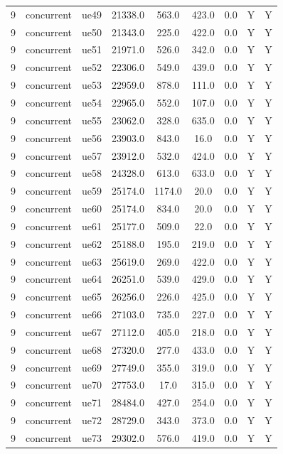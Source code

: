 \begin{table}[ht]
\begin{tabular}{|c|c|c|c|c|c|c|c|c|}
9 & concurrent & ue49 & 21338.0 & 563.0 & 423.0 & 0.0 & Y & Y \\
9 & concurrent & ue50 & 21343.0 & 225.0 & 422.0 & 0.0 & Y & Y \\
9 & concurrent & ue51 & 21971.0 & 526.0 & 342.0 & 0.0 & Y & Y \\
9 & concurrent & ue52 & 22306.0 & 549.0 & 439.0 & 0.0 & Y & Y \\
9 & concurrent & ue53 & 22959.0 & 878.0 & 111.0 & 0.0 & Y & Y \\
9 & concurrent & ue54 & 22965.0 & 552.0 & 107.0 & 0.0 & Y & Y \\
9 & concurrent & ue55 & 23062.0 & 328.0 & 635.0 & 0.0 & Y & Y \\
9 & concurrent & ue56 & 23903.0 & 843.0 & 16.0 & 0.0 & Y & Y \\
9 & concurrent & ue57 & 23912.0 & 532.0 & 424.0 & 0.0 & Y & Y \\
9 & concurrent & ue58 & 24328.0 & 613.0 & 633.0 & 0.0 & Y & Y \\
9 & concurrent & ue59 & 25174.0 & 1174.0 & 20.0 & 0.0 & Y & Y \\
9 & concurrent & ue60 & 25174.0 & 834.0 & 20.0 & 0.0 & Y & Y \\
9 & concurrent & ue61 & 25177.0 & 509.0 & 22.0 & 0.0 & Y & Y \\
9 & concurrent & ue62 & 25188.0 & 195.0 & 219.0 & 0.0 & Y & Y \\
9 & concurrent & ue63 & 25619.0 & 269.0 & 422.0 & 0.0 & Y & Y \\
9 & concurrent & ue64 & 26251.0 & 539.0 & 429.0 & 0.0 & Y & Y \\
9 & concurrent & ue65 & 26256.0 & 226.0 & 425.0 & 0.0 & Y & Y \\
9 & concurrent & ue66 & 27103.0 & 735.0 & 227.0 & 0.0 & Y & Y \\
9 & concurrent & ue67 & 27112.0 & 405.0 & 218.0 & 0.0 & Y & Y \\
9 & concurrent & ue68 & 27320.0 & 277.0 & 433.0 & 0.0 & Y & Y \\
9 & concurrent & ue69 & 27749.0 & 355.0 & 319.0 & 0.0 & Y & Y \\
9 & concurrent & ue70 & 27753.0 & 17.0 & 315.0 & 0.0 & Y & Y \\
9 & concurrent & ue71 & 28484.0 & 427.0 & 254.0 & 0.0 & Y & Y \\
9 & concurrent & ue72 & 28729.0 & 343.0 & 373.0 & 0.0 & Y & Y \\
9 & concurrent & ue73 & 29302.0 & 576.0 & 419.0 & 0.0 & Y & Y \\

\end{tabular}
\end{table}

